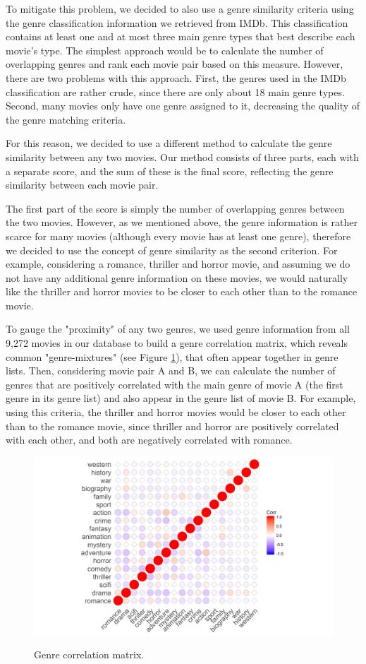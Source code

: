 \documentclass[11pt,a4paper]{article}
\begin{document}
To mitigate this problem, we decided to also use a genre similarity criteria using the genre classification information we retrieved from IMDb. This classification contains at least one and at most three main genre types that best describe each movie's type. The simplest approach would be to calculate the number of overlapping genres and rank each movie pair based on this measure. However, there are two problems with this approach. First, the genres used in the IMDb classification are rather crude, since there are only about 18 main genre types. Second, many movies only have one genre assigned to it, decreasing the quality of the genre matching criteria. 

For this reason, we decided to use a different method to calculate the genre similarity between any two movies. Our method consists of three parts, each with a separate score, and the sum of these is the final score, reflecting the genre similarity between each movie pair. 

The first part of the score is simply the number of overlapping genres between the two movies. However, as we mentioned above, the genre information is rather scarce for many movies (although every movie has at least one genre), therefore we decided to use the concept of genre similarity as the second criterion. For example, considering a romance, thriller and horror movie, and assuming we do not have any additional genre information on these movies, we would naturally like the thriller and horror movies to be closer to each other than to the romance movie. 

To gauge the "proximity" of any two genres, we used genre information from all 9,272 movies in our database to build a genre correlation matrix, which reveals common "genre-mixtures" (see Figure \ref{fig:corr}), that often appear together in genre lists. Then, considering movie pair A and B, we can calculate the number of genres that are positively correlated with the main genre of movie A (the first genre in its genre list) and also appear in the genre list of movie B. For example, using this criteria, the thriller and horror movies would be closer to each other than to the romance movie, since thriller and horror are positively correlated with each other, and both are negatively correlated with romance. 


\begin{figure}
\caption{Genre correlation matrix.}
\includegraphics[width=1\textwidth]{correlation.png}
\label{fig:corr}
\end{figure}
\end{document}
